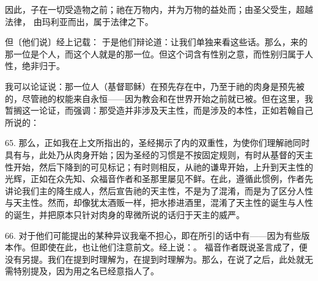 因此，子在一切受造物之前；祂在万物内，并为万物的益处而；由圣父受生，超越法律， 由玛利亚而出，属于法律之下。\par

\par

但〔他们说〕经上记载： 于是他们辩论道：让我们单独来看这些话。那么，来的那一位是个人，而这个人就是的那一位。但这个词含有性别之意，而性别归属于人性，绝非归于。\par

我可以论证说：那一位人（基督耶稣）在预先存在中，乃至于祂的肉身是预先被的，尽管祂的权能来自永恒——因为教会和在世界开始之前就已被。但在这里，我暂搁这一论证，而强调：那受造并非涉及天主性，而是涉及的本性，正如若翰自己所说的：\par

65. 那么，正如我在上文所指出的，圣经揭示了内的双重性，为使你们理解祂同时具有与，此处乃从肉身开始；因为圣经的习惯是不按固定规则，有时从基督的天主性开始，然后下降到的可见标记；有时则相反，从祂的谦卑开始，上升到天主性的光辉，正如在众先知、众福音作者和圣那里屡见不鲜。在此，遵循此惯例，作者先讲论我们主的降生成人，然后宣告祂的天主性，不是为了混淆，而是为了区分人性与天主性。然而，却像犹太酒贩一样，把水掺进酒里，混淆了天主性的诞生与人性的诞生，并把原本只针对肉身的卑微所说的话归于天主的威严。\par

66. 对于他们可能提出的某种异议我毫不担心，即在所引的话中有——因为有些版本作。但即使在此，也让他们注意前文。经上说：。 福音作者既说圣言成了，便没有另提。我们在提到时理解为，在提到时理解为。那么，在说了之后，此处就无需特别提及，因为用之名已经意指人了。\par

